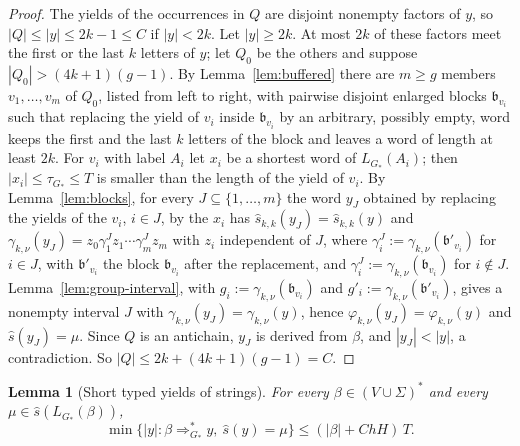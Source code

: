 \documentclass[11pt]{article}
\numberwithin{equation}{section}
\theoremstyle{plain}
\newtheorem{lemma}[theorem]{Lemma}
\theoremstyle{definition}
\theoremstyle{remark}
\theoremstyle{plain}
\begin{document}
\begin{proof}
The yields of the occurrences in $Q$ are disjoint nonempty factors of $y$, so
$|Q|\le|y|\le2k-1\le C$ if $|y|<2k$.  Let $|y|\ge2k$.  At most $2k$ of these
factors meet the first or the last $k$ letters of $y$; let $Q_0$ be the others and
suppose $|Q_0|>(4k+1)(g-1)$.  By Lemma~\ref{lem:buffered} there are $m\ge g$
members $v_1,\ldots,v_m$ of $Q_0$, listed from left to right, with pairwise
disjoint enlarged blocks $\mathfrak b_{v_i}$ such that replacing the yield of $v_i$
inside $\mathfrak b_{v_i}$ by an arbitrary, possibly empty, word keeps the first
and the last $k$ letters of the block and leaves a word of length at least $2k$.
For $v_i$ with label $A_i$ let $x_i$ be a shortest word of $L_{G_*}(A_i)$; then
$|x_i|\le\tau_{G_*}\le T$ is smaller than the length of the yield of $v_i$.
By Lemma~\ref{lem:blocks}, for every $J\subseteq\{1,\ldots,m\}$ the word $y_J$
obtained by replacing the yields of the $v_i$, $i\in J$, by the $x_i$ has
$\widehat s_{k,k}(y_J)=\widehat s_{k,k}(y)$ and
$\gamma_{k,\nu}(y_J)=z_0\gamma^J_1z_1\cdots\gamma^J_mz_m$ with $z_i$ independent
of $J$, where $\gamma^J_i:=\gamma_{k,\nu}(\mathfrak b'_{v_i})$ for $i\in J$, with
$\mathfrak b'_{v_i}$ the block $\mathfrak b_{v_i}$ after the replacement, and
$\gamma^J_i:=\gamma_{k,\nu}(\mathfrak b_{v_i})$ for $i\notin J$.
Lemma~\ref{lem:group-interval}, with $g_i:=\gamma_{k,\nu}(\mathfrak b_{v_i})$ and
$g'_i:=\gamma_{k,\nu}(\mathfrak b'_{v_i})$, gives a nonempty interval $J$ with
$\gamma_{k,\nu}(y_J)=\gamma_{k,\nu}(y)$, hence $\varphi_{k,\nu}(y_J)=\varphi_{k,\nu}(y)$
and $\widehat s(y_J)=\mu$.  Since $Q$ is an antichain, $y_J$ is derived from
$\beta$, and $|y_J|<|y|$, a contradiction.  So $|Q|\le2k+(4k+1)(g-1)=C$.
\end{proof}

\begin{lemma}[Short typed yields of strings]
\label{lem:typed-strings}
For every $\beta\in(V\cup\Sigma)^*$ and every $\mu\in\widehat s(L_{G_*}(\beta))$,
\[
 \min\{|y|:\beta\Rightarrow_{G_*}^*y,\ \widehat s(y)=\mu\}\le(|\beta|+ChH)\,T.
\]
\end{lemma}
\end{document}
